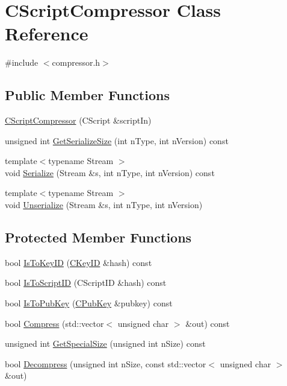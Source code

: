 \hypertarget{class_c_script_compressor}{}\section{C\+Script\+Compressor Class Reference}
\label{class_c_script_compressor}


{\ttfamily \#include $<$compressor.\+h$>$}

\subsection*{Public Member Functions}
\begin{DoxyCompactItemize}
\item 
\hyperlink{class_c_script_compressor_aad31afe3d14387b163b5c043e834ca2b}{C\+Script\+Compressor} (C\+Script \&script\+In)
\item 
unsigned int \hyperlink{class_c_script_compressor_a3b3dd61547c3dc2f7ba9325f74b9ec5f}{Get\+Serialize\+Size} (int n\+Type, int n\+Version) const 
\item 
{\footnotesize template$<$typename Stream $>$ }\\void \hyperlink{class_c_script_compressor_a9d8168293e0a6d0fd8c4aeb63a346525}{Serialize} (Stream \&s, int n\+Type, int n\+Version) const 
\item 
{\footnotesize template$<$typename Stream $>$ }\\void \hyperlink{class_c_script_compressor_a016fa6e3d2735d95fcf773271da073d5}{Unserialize} (Stream \&s, int n\+Type, int n\+Version)
\end{DoxyCompactItemize}
\subsection*{Protected Member Functions}
\begin{DoxyCompactItemize}
\item 
bool \hyperlink{class_c_script_compressor_a13afc45e3a0a8a3d634cfafba9b2a040}{Is\+To\+Key\+I\+D} (\hyperlink{class_c_key_i_d}{C\+Key\+I\+D} \&hash) const 
\item 
bool \hyperlink{class_c_script_compressor_a6da015ff028139ef52e7376166b04928}{Is\+To\+Script\+I\+D} (C\+Script\+I\+D \&hash) const 
\item 
bool \hyperlink{class_c_script_compressor_a4cec58b09c4ab7873b5884ed690ed0f9}{Is\+To\+Pub\+Key} (\hyperlink{class_c_pub_key}{C\+Pub\+Key} \&pubkey) const 
\item 
bool \hyperlink{class_c_script_compressor_a98cb19f185efc85a395a5332574ef56b}{Compress} (std\+::vector$<$ unsigned char $>$ \&out) const 
\item 
unsigned int \hyperlink{class_c_script_compressor_a0e4f4c405f4a937c95fd4270db4d7d66}{Get\+Special\+Size} (unsigned int n\+Size) const 
\item 
bool \hyperlink{class_c_script_compressor_a1feb663ddab3a45218c7cb02f2a25717}{Decompress} (unsigned int n\+Size, const std\+::vector$<$ unsigned char $>$ \&out)
\end{DoxyCompactItemize}


